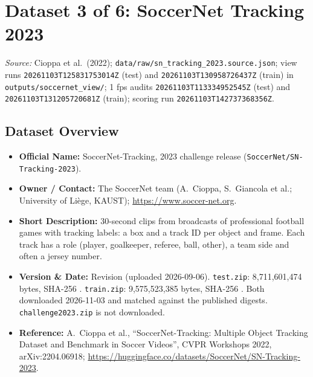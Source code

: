 \documentclass[11pt, a4paper]{article}
\newif\ifreportednoted
\newcommand{\resetreported}{\global\reportednotedfalse}
\begin{document}
\section{Dataset 3 of 6: SoccerNet Tracking 2023}
\resetreported

\begin{sloppypar}\noindent\textit{Source:} Cioppa et al.\ (2022); \texttt{data/raw/}\allowbreak\texttt{sn\_tracking\_2023.source.json}; view runs \texttt{20261103T125831753014Z} (test) and \texttt{20261103T130958726437Z} (train) in \texttt{outputs/}\allowbreak\texttt{soccernet\_view/}; 1 fps audits \texttt{20261103T113334952545Z} (test) and \texttt{20261103T131205720681Z} (train); scoring run \texttt{20261103T142737368356Z}.\end{sloppypar}

\subsection{Dataset Overview}
\begin{itemize}
    \item \textbf{Official Name:} SoccerNet-Tracking, 2023 challenge release (\texttt{SoccerNet/SN-Tracking-2023}).
    \item \textbf{Owner / Contact:} The SoccerNet team (A.~Cioppa, S.~Giancola et al.; University of Liège, KAUST); \url{https://www.soccer-net.org}.
    \item \textbf{Short Description:} 30-second clips from broadcasts of professional football games with tracking labels: a box and a track ID per object and frame. Each track has a role (player, goalkeeper, referee, ball, other), a team side and often a jersey number.
    \item \textbf{Version \& Date:} Revision  (uploaded 2026-09-06). \texttt{test.zip}: 8,711,601,474 bytes, SHA-256 . \texttt{train.zip}: 9,575,523,385 bytes, SHA-256 . Both downloaded 2026-11-03 and matched against the published digests. \texttt{challenge2023.zip} is not downloaded.
    \item \textbf{Reference:} A.~Cioppa et al., ``SoccerNet-Tracking: Multiple Object Tracking Dataset and Benchmark in Soccer Videos'', CVPR Workshops 2022, arXiv:2204.06918; \url{https://huggingface.co/datasets/SoccerNet/SN-Tracking-2023}.
\end{itemize}
\end{document}
